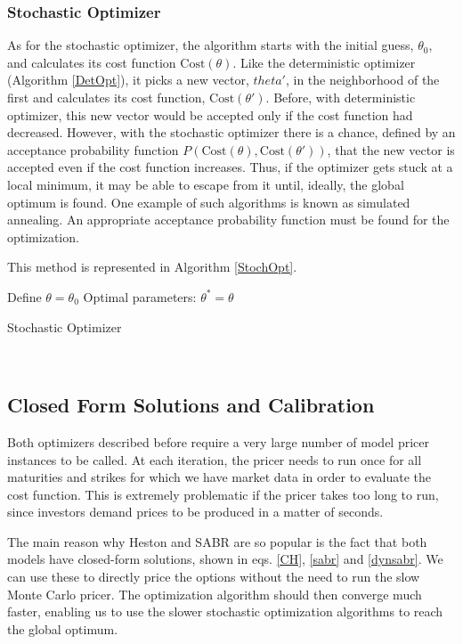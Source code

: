 \subsubsection{Stochastic Optimizer}
As for the stochastic optimizer, the algorithm  starts with the initial guess, $\theta_0$, and calculates its cost function $\mathrm{Cost}(\theta)$. Like the deterministic optimizer (Algorithm \ref{DetOpt}), it picks a new vector, $theta'$, in the neighborhood of the first and calculates its cost function, $\mathrm{Cost}(\theta')$. Before, with deterministic optimizer, this new vector would be accepted only if the cost function had decreased. However, with the stochastic optimizer there is a chance, defined by an acceptance probability function $P(\mathrm{Cost}(\theta),\mathrm{Cost}(\theta'))$, that the new vector is accepted even if the cost function increases. Thus, if the optimizer gets stuck at a local minimum, it may be able to escape from it until, ideally, the global optimum is found. One example of such algorithms is known as simulated annealing. An appropriate acceptance probability function must be found for the optimization.


This method is represented in Algorithm \ref{StochOpt}.

\begin{algorithm}[H]\label{StochOpt}
\DontPrintSemicolon
 Define $\theta=\theta_0$
 Optimal parameters: $\theta^{*}=\theta$\;
 \caption{Stochastic Optimizer}
\end{algorithm}
\ 


\subsection{Closed Form Solutions and Calibration}
Both optimizers described before require a very large number of model pricer instances to be called. At each iteration, the pricer needs to run once for all maturities and strikes for which we have market data in order to evaluate the cost function. This is extremely problematic if the pricer takes too long to run, since investors demand prices to be produced in a matter of seconds.


The main reason why Heston and SABR are so popular is the fact that both models have closed-form solutions, shown in eqs. \eqref{CH}, \eqref{sabr} and \eqref{dynsabr}. We can use these to directly price the options without the need to run the slow Monte Carlo pricer. The optimization algorithm should then converge much faster, enabling us to use the slower stochastic optimization algorithms to reach the global optimum.





